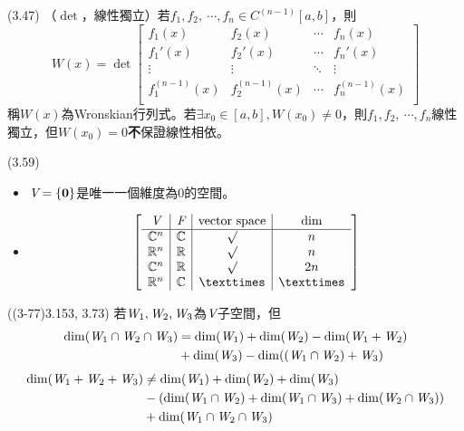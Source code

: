 \item \begin{theorem}{(3.47)} （$\det$，線性獨立）若$f_1, f_2, \ \cdots, f_n \in C^{(n - 1)}[a, b]$，則
	\begin{equation}
		W(x) = \det
		{\left[ 
		\begin{array}{cccc}
			f_1(x) & f_2(x) & \cdots & f_n(x) \\
			f_1'(x) & f_2'(x) & \cdots & f_n'(x) \\
			\vdots & \vdots & \ddots & \vdots \\
			f_1^{(n - 1)}(x) & f_2^{(n - 1)}(x) & \cdots & f_n^{(n - 1)}(x) \\
		\end{array} 
		\right]}
	\end{equation}
	稱$W(x)$為Wronskian行列式。若$\exists x_0 \in [a, b], W(x_0) \neq 0$，則$f_1, f_2, \ \cdots, f_n$線性獨立，但$W(x_0) = 0$\textbf{不}保證線性相依。
\end{theorem}

\item \begin{theorem}{(3.59)} \quad\quad
	\begin{itemize}
		\item $\textit{V} = \{\boldsymbol{0}\}$是唯一一個維度為$0$的空間。
		\item $$
		{\left[ 
		\begin{array}{c|c|c|c}
			\spc{V} & \F & \text{vector space} & \text{dim} \\
			\hline
			\C^n & \C & \surd & n \\
			\R^n & \R & \surd & n \\
			\C^n & \R & \surd & 2n \\
			\R^n & \C & \texttimes & \texttimes
		\end{array} 
		\right]}
		$$
	\end{itemize}
\end{theorem}

\item \begin{theorem}{((3-77)3.153, 3.73)} 若$\textit{W}_1, \textit{W}_2, \textit{W}_3$為$\textit{V}$子空間，但
	\begin{equation}
		\begin{aligned}
			\dim(\textit{W}_1 \cap \textit{W}_2 \cap \textit{W}_3) 
			& = \dim(\textit{W}_1) + \dim(\textit{W}_2) - \dim(\textit{W}_1 + \textit{W}_2) \\
			& + \dim(\textit{W}_3) - \dim((\textit{W}_1 \cap \textit{W}_2) + \textit{W}_3) 
		\end{aligned}
	\end{equation}
	\begin{equation}
		\begin{aligned}
			\dim(\textit{W}_1 + \textit{W}_2 + \textit{W}_3) 
			& \neq \dim(\textit{W}_1) + \dim(\textit{W}_2) + \dim(\textit{W}_3) \\
			& - (\dim(\textit{W}_1 \cap \textit{W}_2) + \dim(\textit{W}_1 \cap \textit{W}_3) + \dim(\textit{W}_2 \cap \textit{W}_3)) \\
			& + \dim(\textit{W}_1 \cap \textit{W}_2 \cap \textit{W}_3) 
		\end{aligned}
	\end{equation}
\end{theorem}

